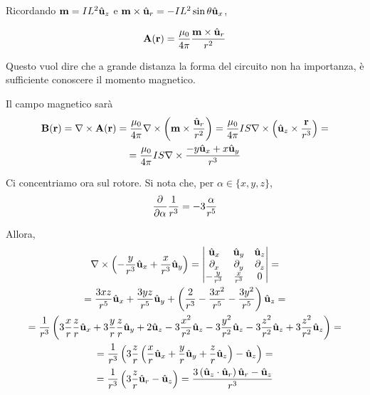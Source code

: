 Ricordando $\mathbf{m} = IL^2 \hat{\mathbf{u}}_{z}$ e $\mathbf{m} \times \hat{\mathbf{u}}_{r} = -IL^2 \sin\theta \hat{\mathbf{u}}_{x}$,

\begin{gather}
    \mathbf{A}(\mathbf{r}) = \frac{\mu_0}{4\pi} \frac{\mathbf{m} \times \hat{\mathbf{u}}_{r}}{r^2}
\end{gather}

Questo vuol dire che a grande distanza la forma del circuito non ha importanza, è sufficiente conoscere il momento magnetico.

Il campo magnetico sarà
\begin{equation}
\begin{gathered}
    \mathbf{B}(\mathbf{r}) = \nabla \times \mathbf{A}(\mathbf{r}) = \frac{\mu_0}{4\pi} \nabla \times \left( \mathbf{m} \times \frac{\hat{\mathbf{u}}_{r}}{r^2} \right)
    = \frac{\mu_0}{4\pi} I S \nabla \times \left( \hat{\mathbf{u}}_{z} \times \frac{\mathbf{r}}{r^3} \right) = \\
    = \frac{\mu_0}{4\pi} I S \nabla \times \frac{-y\hat{\mathbf{u}}_{x} + x\hat{\mathbf{u}}_{y}}{r^3}
\end{gathered}
\end{equation}

Ci concentriamo ora sul rotore.
Si nota che, per $\alpha \in \{x, y, z\}$,
\begin{equation}
    \parder{\alpha} \frac{1}{r^3} = -3 \frac{\alpha}{r^5}
\end{equation}

Allora,
\begin{equation}
\begin{gathered}
    \curl \pts{-\frac{y}{r^3} \ux + \frac{x}{r^3}\uy}
    = \begin{vmatrix}
        \ux & \uy & \uz \\
        \parder{x} & \parder{y} & \parder{z} \\
        -\frac{y}{r^3} & \frac{x}{r^3} & 0
    \end{vmatrix} = \\
    = \frac{3 x z}{r^5} \ux + \frac{3 y z}{r^5} \uy + \pts{\frac{2}{r^3} - \frac{3 x^2}{r^5} - \frac{3 y^2}{r^5}} \uz = \\
    = \frac{1}{r^3} \pts{
        3 \frac{x}{r} \frac{z}{r} \ux +
        3 \frac{y}{r} \frac{z}{r} \uy +
        2 \uz
        - 3 \frac{x^2}{r^2} \uz
        - 3 \frac{y^2}{r^2} \uz
        - 3 \frac{z^2}{r^2} \uz
        + 3 \frac{z^2}{r^2} \uz
    } = \\
    = \frac{1}{r^3} \pts{
        3 \frac{z}{r} \pts{
            \frac{x}{r} \ux +
            \frac{y}{r} \uy +
            \frac{z}{r} \uz
        } - \uz
    } = \\
    = \frac{1}{r^3} \pts{3 \frac{z}{r} \ver{r} - \uz}
    = \frac{3 \pts{\uz \cdot \ver{r}} \ver{r} - \uz}{r^3}
\end{gathered}
\end{equation}

